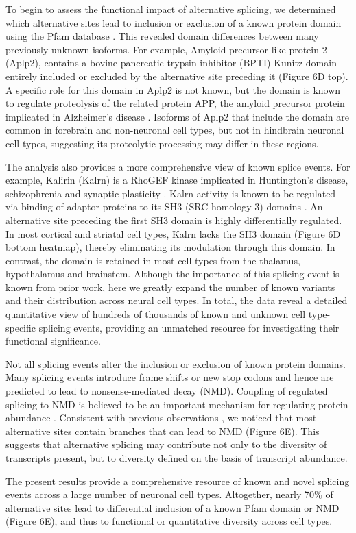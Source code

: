 To begin to assess the functional impact of alternative splicing, we determined which alternative sites lead to inclusion or exclusion of a known protein domain using the Pfam database \citep{Finn_2015}. This revealed domain differences between many previously unknown isoforms. For example, Amyloid precursor-like protein 2 (Aplp2), contains a bovine pancreatic trypsin inhibitor (BPTI) Kunitz domain entirely included or excluded by the alternative site preceding it (Figure 6D top). A specific role for this domain in Aplp2 is not known, but the domain is known to regulate proteolysis of the related protein APP, the amyloid precursor protein implicated in Alzheimer's disease \citep{Beckmann_2016}. Isoforms of Aplp2 that include the domain are common in forebrain and non-neuronal cell types, but not in hindbrain neuronal cell types, suggesting its proteolytic processing may differ in these regions.

The analysis also provides a more comprehensive view of known splice events. For example, Kalirin (Kalrn) is a RhoGEF kinase implicated in Huntington's disease, schizophrenia and synaptic plasticity \citep{Penzes_2008}. Kalrn activity is known to be regulated via binding of adaptor proteins to its SH3 (SRC homology 3) domains \citep{Schiller_2006}. An alternative site preceding the first SH3 domain is highly differentially regulated. In most cortical and striatal cell types, Kalrn lacks the SH3 domain (Figure 6D bottom heatmap), thereby eliminating its modulation through this domain. In contrast, the domain is retained in most cell types from the thalamus, hypothalamus and brainstem. Although the importance of this splicing event is known from prior work, here we greatly expand the number of known variants and their distribution across neural cell types. In total, the data reveal a detailed quantitative view of hundreds of thousands of known and unknown cell type-specific splicing events, providing an unmatched resource for investigating their functional significance.

Not all splicing events alter the inclusion or exclusion of known protein domains. Many splicing events introduce frame shifts or new stop codons and hence are predicted to lead to nonsense-mediated decay (NMD). Coupling of regulated splicing to NMD is believed to be an important mechanism for regulating protein abundance \cite{Lewis_2002}. Consistent with previous observations \citep{Yan_2015}, we noticed that most alternative sites contain branches that can lead to NMD (Figure 6E). This suggests that alternative splicing may contribute not only to the diversity of transcripts present, but to diversity defined on the basis of transcript abundance. 

The present results provide a comprehensive resource of known and novel splicing events across a large number of neuronal cell types. Altogether, nearly 70\% of alternative sites lead to differential inclusion of a known Pfam domain or NMD (Figure 6E), and thus to functional or quantitative diversity across cell types.
